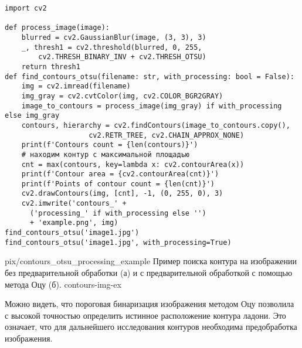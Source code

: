 \begin{verbatim}
import cv2

def process_image(image):
    blurred = cv2.GaussianBlur(image, (3, 3), 3)
    _, thresh1 = cv2.threshold(blurred, 0, 255,
        cv2.THRESH_BINARY_INV + cv2.THRESH_OTSU)
    return thresh1
def find_contours_otsu(filename: str, with_processing: bool = False):
    img = cv2.imread(filename)
    img_gray = cv2.cvtColor(img, cv2.COLOR_BGR2GRAY)
    image_to_contours = process_image(img_gray) if with_processing else img_gray
    contours, hierarchy = cv2.findContours(image_to_contours.copy(),
                    cv2.RETR_TREE, cv2.CHAIN_APPROX_NONE)
    print(f'Contours count = {len(contours)}')
    # находим контур с максимальной площадью
    cnt = max(contours, key=lambda x: cv2.contourArea(x))
    print(f'Contour area = {cv2.contourArea(cnt)}')
    print(f'Points of contour count = {len(cnt)}')
    cv2.drawContours(img, [cnt], -1, (0, 255, 0), 3)
    cv2.imwrite('contours_' + 
      ('processing_' if with_processing else '') 
      + 'example.png', img)
find_contours_otsu('image1.jpg')
find_contours_otsu('image1.jpg', with_processing=True)
\end{verbatim}

\newpage

{pix/contours_otsu_processing_example}
{Пример поиска контура на изображении без предварительной обработки
(а) и с предварительной обработкой с помощью метода Оцу (б).}
{contours-img-ex}

Можно видеть, что пороговая бинаризация изображения методом Оцу 
позволила с высокой точностью определить истинное расположение контура
ладони. Это означает, что для дальнейшего исследования контуров
необходима предобработка изображения.


